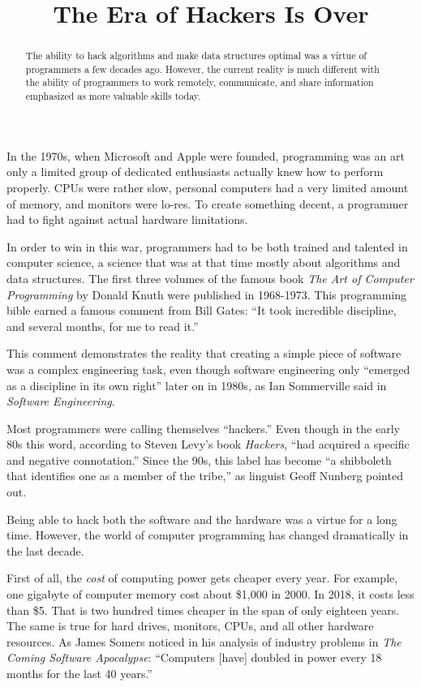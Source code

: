 \documentclass{main}
\title{The Era of Hackers Is Over}
\begin{document}
\begin{abstract}
The ability to hack algorithms and make data structures optimal
was a virtue of programmers a few decades ago. However, the current reality is
much different with the ability of programmers to work remotely, communicate, and share
information emphasized as more valuable skills today.
\end{abstract}

\cite{hoffmann2011}
In the 1970s, when Microsoft and Apple were founded,
programming was an art only a limited group of dedicated
enthusiasts actually knew how to perform properly. CPUs were rather slow,
personal computers had a very limited amount of memory, and monitors
were lo-res. To create something decent, a programmer had to
fight against actual hardware limitations.

In order to win in this war, programmers had to be both trained and talented in
computer science, a science that was at that time mostly about algorithms and data structures.
The first three volumes of the famous book \emph{The Art of Computer Programming} by Donald Knuth
were published in 1968-1973.
This programming bible earned a famous comment
from Bill Gates: ``It took incredible discipline, and several months, for me to read it.''

This comment demonstrates the reality that creating a simple piece of software was a complex engineering task,
even though software engineering only ``emerged as a discipline in its own right''
later on in 1980s, as Ian Sommerville
said in \emph{Software Engineering}.

Most programmers were calling themselves ``hackers.''
Even though in the early 80s this word,
according to Steven Levy's book \emph{Hackers},
``had acquired a specific and negative connotation.''
Since the 90s, this label has become
``a shibboleth that identifies one as a member of the tribe,''
as linguist Geoff Nunberg pointed out.

Being able to hack both the software and the hardware was a virtue for a long time.
However, the world of computer programming has changed dramatically in the last decade.

First of all, the \emph{cost} of computing power
gets cheaper every year.
For example, one gigabyte of computer memory cost about \$1,000 in 2000.
In 2018, it costs less than \$5. That is two hundred times cheaper in the span of only
eighteen years. The same is true for
hard drives, monitors, CPUs, and all
other hardware resources. As James Somers noticed in his analysis of industry problems in
\emph{The Coming Software Apocalypse}:
``Computers [have] doubled in power every 18 months for the last 40 years.''
\end{document}
